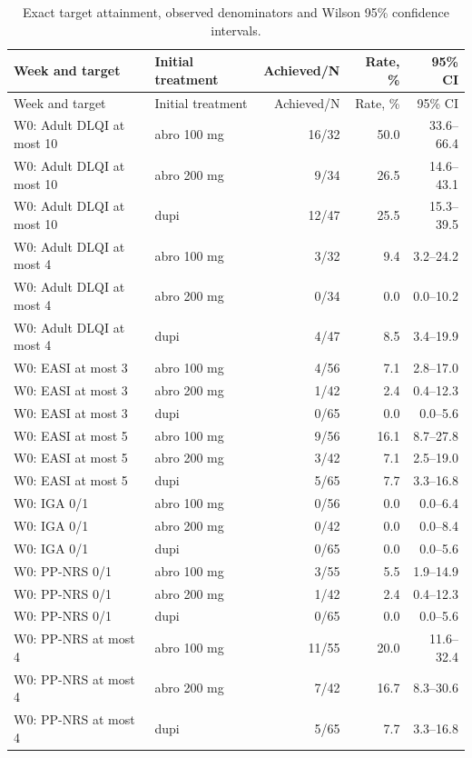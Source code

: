 \begin{longtable}{llrrr}
\caption{Exact target attainment, observed denominators and Wilson 95\% confidence intervals.}\label{tab:exact_target_rates}\\
\toprule Week and target & Initial treatment & Achieved/N & Rate, \% & 95\% CI \\ \midrule\endfirsthead
\toprule Week and target & Initial treatment & Achieved/N & Rate, \% & 95\% CI \\ \midrule\endhead
W0: Adult DLQI at most 10 & abro 100 mg & 16/32 & 50.0 & 33.6--66.4 \\
W0: Adult DLQI at most 10 & abro 200 mg & 9/34 & 26.5 & 14.6--43.1 \\
W0: Adult DLQI at most 10 & dupi & 12/47 & 25.5 & 15.3--39.5 \\
W0: Adult DLQI at most 4 & abro 100 mg & 3/32 & 9.4 & 3.2--24.2 \\
W0: Adult DLQI at most 4 & abro 200 mg & 0/34 & 0.0 & 0.0--10.2 \\
W0: Adult DLQI at most 4 & dupi & 4/47 & 8.5 & 3.4--19.9 \\
W0: EASI at most 3 & abro 100 mg & 4/56 & 7.1 & 2.8--17.0 \\
W0: EASI at most 3 & abro 200 mg & 1/42 & 2.4 & 0.4--12.3 \\
W0: EASI at most 3 & dupi & 0/65 & 0.0 & 0.0--5.6 \\
W0: EASI at most 5 & abro 100 mg & 9/56 & 16.1 & 8.7--27.8 \\
W0: EASI at most 5 & abro 200 mg & 3/42 & 7.1 & 2.5--19.0 \\
W0: EASI at most 5 & dupi & 5/65 & 7.7 & 3.3--16.8 \\
W0: IGA 0/1 & abro 100 mg & 0/56 & 0.0 & 0.0--6.4 \\
W0: IGA 0/1 & abro 200 mg & 0/42 & 0.0 & 0.0--8.4 \\
W0: IGA 0/1 & dupi & 0/65 & 0.0 & 0.0--5.6 \\
W0: PP-NRS 0/1 & abro 100 mg & 3/55 & 5.5 & 1.9--14.9 \\
W0: PP-NRS 0/1 & abro 200 mg & 1/42 & 2.4 & 0.4--12.3 \\
W0: PP-NRS 0/1 & dupi & 0/65 & 0.0 & 0.0--5.6 \\
W0: PP-NRS at most 4 & abro 100 mg & 11/55 & 20.0 & 11.6--32.4 \\
W0: PP-NRS at most 4 & abro 200 mg & 7/42 & 16.7 & 8.3--30.6 \\
W0: PP-NRS at most 4 & dupi & 5/65 & 7.7 & 3.3--16.8 \\

\end{longtable}

